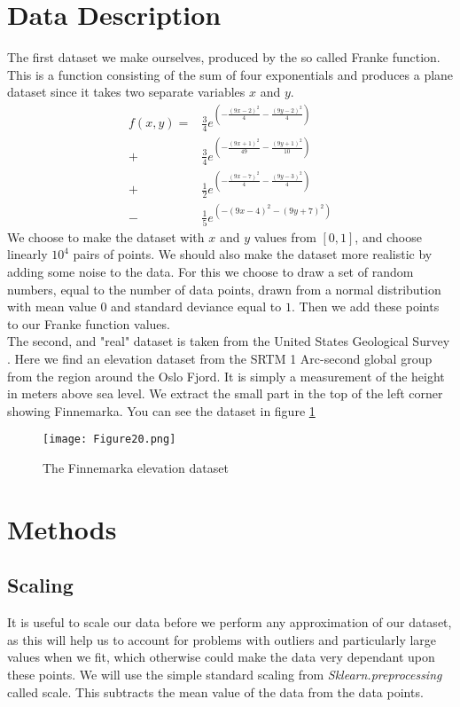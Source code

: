\documentclass[11pt, A4paper, english]{article}
\begin{document}
\begin{multicols}{2}
		\section{Data Description}
The first dataset we make ourselves, produced by the so called Franke function. This is a function consisting of the sum of four exponentials and produces a plane dataset since it takes two separate variables $x$ and $y$.
		\begin{align}
f(x, y) =& \frac{3}{4} e^{\left( - \frac{\left( 9x - 2 \right)^2}{4} - \frac{\left( 9y - 2 \right)^2}{4} \right)} \\
\nonumber +& \frac{3}{4} e^{\left( - \frac{\left( 9x + 1 \right)^2}{49} - \frac{\left( 9y + 1 \right)^2}{10} \right)} \\
\nonumber +& \frac{1}{2} e^{\left( - \frac{\left( 9x - 7 \right)^2}{4} - \frac{\left( 9y - 3 \right)^2}{4} \right)} \\
\nonumber -& \frac{1}{5} e^{\left( - \left( 9x - 4 \right)^2 - \left( 9y + 7 \right)^2 \right)}
		\end{align}
We choose to make the dataset with $x$ and $y$ values from $[0, 1]$, and choose linearly $10^4$ pairs of points. We should also make the dataset more realistic by adding some noise to the data. For this we choose to draw a set of random numbers, equal to the number of data points, drawn from a normal distribution with mean value $0$ and standard deviance equal to $1$. Then we add these points to our Franke function values. \\
The second, and "real" dataset is taken from the United States Geological Survey \cite{USGS}. Here we find an elevation dataset from the SRTM 1 Arc-second global group from the region around the Oslo Fjord.  It is simply a measurement of the height in meters above sea level. We extract the small part in the top of the left corner showing Finnemarka. You can see the dataset in figure \ref{Finnemarka}
		\begin{figure}[H]
\texttt{[image: Figure20.png]}
\caption{The Finnemarka elevation dataset}
\label{Finnemarka}
		\end{figure}

		\section{Methods}
			\subsection{Scaling}
It is useful to scale our data before we perform any approximation of our dataset, as this will help us to account for problems with outliers and particularly large values when we fit, which otherwise could make the data very dependant upon these points. We will use the simple standard scaling from \textit{Sklearn.preprocessing} called scale. This subtracts the mean value of the data from the data points.


\end{multicols}
\end{document}
